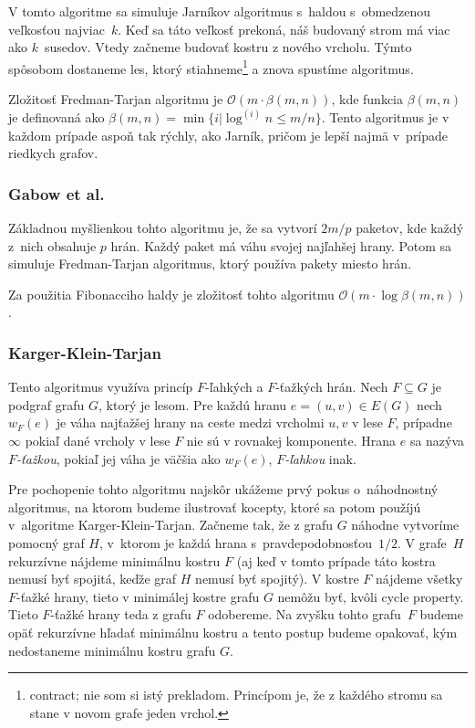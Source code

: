 V tomto algoritme sa simuluje Jarníkov algoritmus s~haldou s~obmedzenou
veľkosťou najviac~$k$. Keď sa táto veľkosť prekoná, náš budovaný strom má 
viac ako $k$~susedov. Vtedy začneme budovať kostru z nového vrcholu. Týmto
spôsobom dostaneme les, ktorý stiahneme\footnote{contract; nie som si istý 
prekladom. Princípom je, že z každého stromu sa stane v novom grafe jeden
vrchol.} a znova spustíme algoritmus.

Zložitosť Fredman-Tarjan algoritmu je $\mathcal{O}(m \cdot \beta(m,n))$, kde
funkcia $\beta(m,n)$ je definovaná ako $\beta(m,n)= \min\{ i | \log^{(i)}n \leq m/n \}$.
Tento algoritmus je v každom prípade aspoň tak rýchly, ako Jarník, pričom
je lepší najmä v~prípade riedkych grafov.

\subsubsection*{Gabow et al.}

Základnou myšlienkou tohto algoritmu je, že sa vytvorí $2m/p$ paketov,
kde každý z~nich obsahuje $p$ hrán. Každý paket má váhu svojej najľahšej
hrany. Potom sa simuluje Fredman-Tarjan algoritmus, ktorý používa pakety
miesto hrán.

Za použitia Fibonacciho haldy je zložitosť tohto algoritmu 
$\mathcal{O}(m \cdot \log\beta(m,n))$.

\subsubsection*{Karger-Klein-Tarjan}

Tento algoritmus využíva princíp $F$-ľahkých a $F$-ťažkých hrán.
Nech $F\subseteq G$ je podgraf grafu $G$, ktorý je lesom. Pre
každú hranu $e=(u,v) \in E(G)$ nech $w_F(e)$ je váha najťažšej hrany
na ceste medzi vrcholmi $u,v$ v lese $F$, prípadne $\infty$ pokiaľ
dané vrcholy v lese $F$ nie sú v rovnakej komponente. Hrana $e$
sa nazýva {\em $F$-ťažkou}, pokiaľ jej váha je väčšia ako $w_F(e)$, 
{\em $F$-ľahkou} inak.

Pre pochopenie tohto algoritmu najskôr ukážeme prvý pokus o~náhodnostný
algoritmus, na ktorom budeme ilustrovať kocepty, ktoré sa potom 
použíjú v~algoritme Karger-Klein-Tarjan. Začneme tak, že z grafu $G$ náhodne
vytvoríme pomocný graf $H$, v~ktorom je každá hrana s~pravdepodobnosťou~$1/2$. 
V grafe~$H$ rekurzívne nájdeme minimálnu kostru $F$ (aj keď v tomto prípade
táto kostra nemusí byť spojitá, keďže graf $H$ nemusí byť spojitý).
V kostre $F$ nájdeme všetky $F$-ťažké hrany, tieto v minimálej 
kostre grafu $G$ nemôžu byť, kvôli cycle property. Tieto $F$-ťažké
hrany teda z grafu $F$ odobereme. Na zvyšku tohto grafu~$F$ budeme
opäť rekurzívne hľadať minimálnu kostru a tento postup budeme opakovať, kým
nedostaneme minimálnu kostru grafu $G$.


